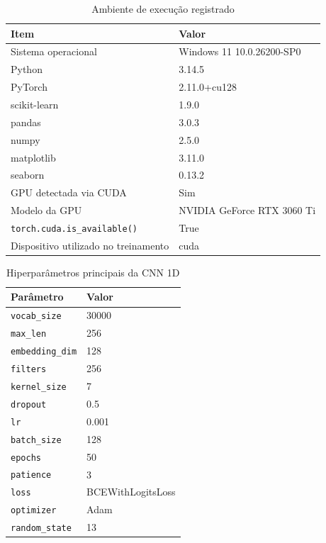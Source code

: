 \documentclass[12pt,a4paper]{article}
\begin{document}
\begin{table}[H]
\centering
\renewcommand{\arraystretch}{1.2}
\caption{Ambiente de execução registrado}
\label{tab:ambiente-execucao}
\begin{tabularx}{0.82\textwidth}{@{} L{5.4cm} Y @{}}
\toprule
\textbf{Item} & \textbf{Valor} \\
\midrule
Sistema operacional & Windows 11 10.0.26200-SP0 \\
Python & 3.14.5 \\
PyTorch & 2.11.0+cu128 \\
scikit-learn & 1.9.0 \\
pandas & 3.0.3 \\
numpy & 2.5.0 \\
matplotlib & 3.11.0 \\
seaborn & 0.13.2 \\
GPU detectada via CUDA & Sim \\
Modelo da GPU & NVIDIA GeForce RTX 3060 Ti \\
\texttt{torch.cuda.is\_available()} & True \\
Dispositivo utilizado no treinamento & cuda \\
\bottomrule
\end{tabularx}
\end{table}

\begin{table}[H]
\centering
\renewcommand{\arraystretch}{1.2}
\caption{Hiperparâmetros principais da CNN 1D}
\label{tab:hiperparametros}
\begin{tabularx}{0.72\textwidth}{@{} L{4.5cm} Y @{}}
\toprule
\textbf{Parâmetro} & \textbf{Valor} \\
\midrule
\texttt{vocab\_size} & 30000 \\
\texttt{max\_len} & 256 \\
\texttt{embedding\_dim} & 128 \\
\texttt{filters} & 256 \\
\texttt{kernel\_size} & 7 \\
\texttt{dropout} & 0.5 \\
\texttt{lr} & 0.001 \\
\texttt{batch\_size} & 128 \\
\texttt{epochs} & 50 \\
\texttt{patience} & 3 \\
\texttt{loss} & BCEWithLogitsLoss \\
\texttt{optimizer} & Adam \\
\texttt{random\_state} & 13 \\
\bottomrule
\end{tabularx}
\end{table}
\end{document}
